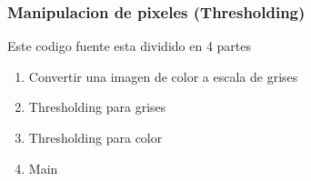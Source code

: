 \begin{frame}[fragile]
   \frametitle{Manipulacion de pixeles (Thresholding)}

    Este codigo fuente esta dividido en 4 partes

    \begin{enumerate}
        \item Convertir una imagen de color a escala de grises
        \item Thresholding para grises
        \item Thresholding para color
        \item Main
    \end{enumerate}

\end{frame}
